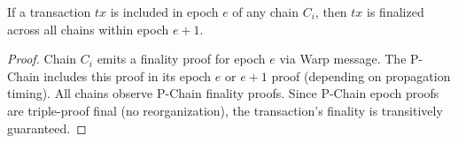 \begin{theorem}
If a transaction $tx$ is included in epoch $e$ of any chain $C_i$, then $tx$ is finalized across all chains within epoch $e+1$.
\end{theorem}

\begin{proof}
Chain $C_i$ emits a finality proof for epoch $e$ via Warp message. The P-Chain includes this proof in its epoch $e$ or $e+1$ proof (depending on propagation timing). All chains observe P-Chain finality proofs. Since P-Chain epoch proofs are triple-proof final (no reorganization), the transaction's finality is transitively guaranteed.
\end{proof}

